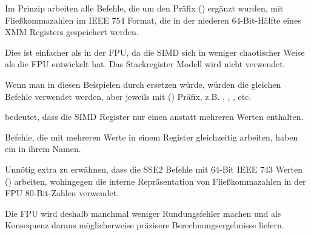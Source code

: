 Im Prinzip arbeiten alle Befehle, die um den Präfix  () ergänzt wurden, mit
Fließkommazahlen im IEEE 754 Format, die in der niederen 64-Bit-Hälfte eines XMM Registers gespeichert werden.

Dies ist einfacher als in der FPU, da die SIMD sich in weniger chaotischer Weise als die FPU entwickelt hat.
Das Stackregister Modell wird nicht verwendet.

Wenn man in diesen Beispielen \Tdouble durch \Tfloat ersetzen würde, würden die gleichen Befehle verwendet werden, aber
jeweils mit () Präfix, z.B. , , , etc.

 bedeutet, dass die SIMD Register nur einen anstatt mehreren Werten enthalten.

Befehle, die mit mehreren Werte in einem Register gleichzeitig arbeiten, haben ein  in ihrem Namen.

Unnötig extra zu erwähnen, dass die SSE2 Befehle mit 64-Bit IEEE 743 Werten (\Tdouble) arbeiten, wohingegen die interne
Repräsentation von Fließkommazahlen in der FPU 80-Bit-Zahlen verwendet.

Die FPU wird deshalb manchmal weniger Rundungsfehler machen und als Konsequenz daraus möglicherweise präzisere
Berechnungsergebnisse liefern.